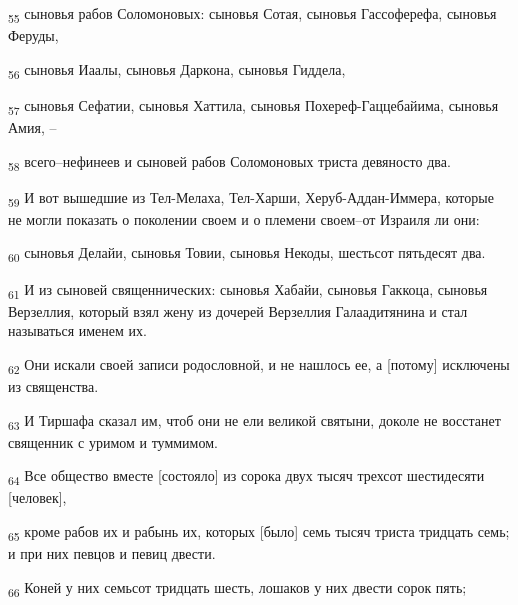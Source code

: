 \begin{tcolorbox}
\textsubscript{55} сыновья рабов Соломоновых: сыновья Сотая, сыновья Гассоферефа, сыновья Феруды,
\end{tcolorbox}
\begin{tcolorbox}
\textsubscript{56} сыновья Иаалы, сыновья Даркона, сыновья Гиддела,
\end{tcolorbox}
\begin{tcolorbox}
\textsubscript{57} сыновья Сефатии, сыновья Хаттила, сыновья Похереф-Гаццебайима, сыновья Амия, --
\end{tcolorbox}
\begin{tcolorbox}
\textsubscript{58} всего--нефинеев и сыновей рабов Соломоновых триста девяносто два.
\end{tcolorbox}
\begin{tcolorbox}
\textsubscript{59} И вот вышедшие из Тел-Мелаха, Тел-Харши, Херуб-Аддан-Иммера, которые не могли показать о поколении своем и о племени своем--от Израиля ли они:
\end{tcolorbox}
\begin{tcolorbox}
\textsubscript{60} сыновья Делайи, сыновья Товии, сыновья Некоды, шестьсот пятьдесят два.
\end{tcolorbox}
\begin{tcolorbox}
\textsubscript{61} И из сыновей священнических: сыновья Хабайи, сыновья Гаккоца, сыновья Верзеллия, который взял жену из дочерей Верзеллия Галаадитянина и стал называться именем их.
\end{tcolorbox}
\begin{tcolorbox}
\textsubscript{62} Они искали своей записи родословной, и не нашлось ее, а [потому] исключены из священства.
\end{tcolorbox}
\begin{tcolorbox}
\textsubscript{63} И Тиршафа сказал им, чтоб они не ели великой святыни, доколе не восстанет священник с уримом и туммимом.
\end{tcolorbox}
\begin{tcolorbox}
\textsubscript{64} Все общество вместе [состояло] из сорока двух тысяч трехсот шестидесяти [человек],
\end{tcolorbox}
\begin{tcolorbox}
\textsubscript{65} кроме рабов их и рабынь их, которых [было] семь тысяч триста тридцать семь; и при них певцов и певиц двести.
\end{tcolorbox}
\begin{tcolorbox}
\textsubscript{66} Коней у них семьсот тридцать шесть, лошаков у них двести сорок пять;
\end{tcolorbox}
